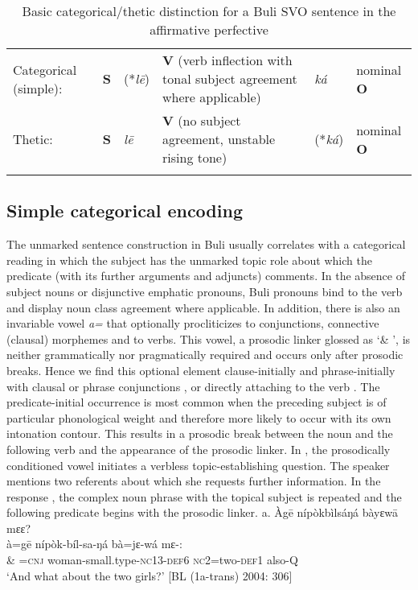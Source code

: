 \documentclass[output=paper]{langsci/langscibook}
\begin{document}
\begin{table}
\caption{Basic categorical/thetic distinction for a Buli SVO sentence in the affirmative perfective}
\label{tab:2}


\begin{tabularx}{\textwidth}{XXXXXX}
\lsptoprule

{Categorical (simple):} & {\textbf{S}} & {(*\textit{l\={e}})} & {\textbf{V} (verb inflection with tonal subject agreement where applicable)} & {\textit{ká}} & {nominal \textbf{O}}\\
{Thetic:} & {\textbf{S}} & {\textit{l\={e}}} & {\textbf{V} (no subject agreement, unstable rising tone)} & {(*\textit{ká})} & {nominal \textbf{O}}\\
\lspbottomrule
\end{tabularx}

\end{table} 

\subsection{Simple categorical encoding}

The unmarked sentence construction in Buli usually correlates with a categorical reading in which the subject has the unmarked topic role about which the predicate (with its further arguments and adjuncts) comments. In the absence of subject nouns or disjunctive emphatic pronouns, Buli pronouns bind to the verb and display noun class agreement where applicable. In addition, there is also an invariable vowel \textit{a=} that optionally procliticizes to conjunctions, connective (clausal) morphemes and to verbs. This vowel, a prosodic linker glossed as ‘\& ’, is neither grammatically nor pragmatically required and occurs only after prosodic breaks. Hence we find this optional element clause-initially  and phrase-initially  with clausal or phrase conjunctions , or directly attaching to the verb . The predicate-initial occurrence is most common when the preceding subject is of particular phonological weight and therefore more likely to occur with its own intonation contour. This results in a prosodic break between the noun and the following verb and the appearance of the prosodic linker. In , the prosodically conditioned vowel initiates a verbless topic-establishing question. The speaker mentions two referents about which she requests further information. In the response , the complex noun phrase with the topical subject is repeated and the following predicate begins with the prosodic linker.  
\ea
\glll \textup{  a.}  Àg\={e}  nípòkbìlsáŋá        bàyɛw\={a}    mɛɛ?\\
     \textup{à=g\={e}  nípòk-bíl-sa-ŋá      bà=jɛ-wá    mɛ-:}\\
     \& =\textsc{cnj}  woman-small.type-\textsc{nc}13-\textsc{def}6  \textsc{nc}2=two-\textsc{def}1  also-\textsc{Q}\\
\glt   ‘And what about the two girls?’ [BL (1a-trans) 2004: 306]
\z
\end{document}

